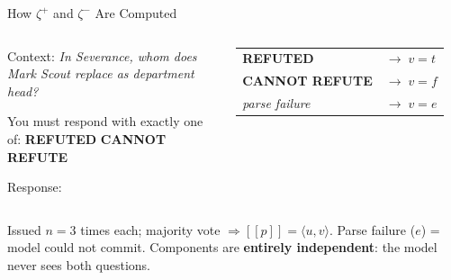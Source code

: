 \documentclass[aspectratio=169,9pt]{beamer}
\newcommand{\tv}[2]{\langle #1,#2 \rangle}
\newcommand{\semp}{[\![p]\!]}
\begin{document}
\begin{frame}[fragile]{How $\zeta^+$ and $\zeta^-$ Are Computed}
\begin{columns}[T]
\begin{block}{}
      \smallskip
      Context: \textit{In Severance, whom does
      Mark Scout replace as department head?}

      \smallskip
      You must respond with exactly one of:
      \textbf{REFUTED}
      \textbf{CANNOT REFUTE}

      \smallskip
      Response:
    \end{block}
    \smallskip
    \footnotesize
    \begin{tabular}{ll}
      \textbf{REFUTED} & $\to\; v = t$ \\
      \textbf{CANNOT REFUTE} & $\to\; v = f$ \\
      \textit{parse failure} & $\to\; v = e$
    \end{tabular}

  \end{columns}

  \smallskip
  \footnotesize
  Issued $n=3$ times each; majority vote $\Rightarrow \semp=\tv{u}{v}$.
  Parse failure ($e$) = model could not commit.
  Components are \textbf{entirely independent}: the model never sees both questions.

\end{frame}
\end{document}
